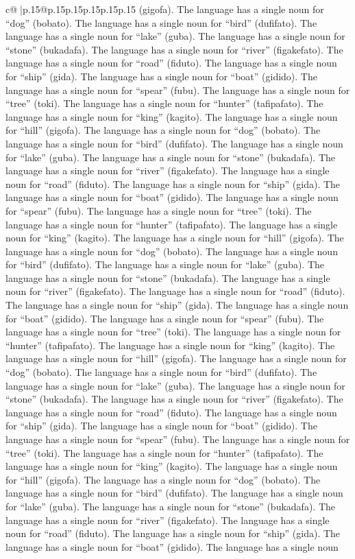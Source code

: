 \documentclass{article}
\begin{document}
{\begin{supertabular}{c@{$\;$}|p{.15\linewidth}@{}p{.15\linewidth}p{.15\linewidth}p{.15\linewidth}p{.15\linewidth}p{.15\linewidth}}
{{{(gigofa). The language has a single noun for “dog” (bobato). The language has a single noun for “bird” (dufifato). The language has a single noun for “lake” (guba). The language has a single noun for “stone” (bukadafa). The language has a single noun for “river” (figakefato). The language has a single noun for “road” (fiduto). The language has a single noun for “ship” (gida). The language has a single noun for “boat” (gidido). The language has a single noun for “spear” (fubu). The language has a single noun for “tree” (toki). The language has a single noun for “hunter” (tafipafato). The language has a single noun for “king” (kagito). The language has a single noun for “hill” (gigofa). The language has a single noun for “dog” (bobato). The language has a single noun for “bird” (dufifato). The language has a single noun for “lake” (guba). The language has a single noun for “stone” (bukadafa). The language has a single noun for “river” (figakefato). The language has a single noun for “road” (fiduto). The language has a single noun for “ship” (gida). The language has a single noun for “boat” (gidido). The language has a single noun for “spear” (fubu). The language has a single noun for “tree” (toki). The language has a single noun for “hunter” (tafipafato). The language has a single noun for “king” (kagito). The language has a single noun for “hill” (gigofa). The language has a single noun for “dog” (bobato). The language has a single noun for “bird” (dufifato). The language has a single noun for “lake” (guba). The language has a single noun for “stone” (bukadafa). The language has a single noun for “river” (figakefato). The language has a single noun for “road” (fiduto). The language has a single noun for “ship” (gida). The language has a single noun for “boat” (gidido). The language has a single noun for “spear” (fubu). The language has a single noun for “tree” (toki). The language has a single noun for “hunter” (tafipafato). The language has a single noun for “king” (kagito). The language has a single noun for “hill” (gigofa). The language has a single noun for “dog” (bobato). The language has a single noun for “bird” (dufifato). The language has a single noun for “lake” (guba). The language has a single noun for “stone” (bukadafa). The language has a single noun for “river” (figakefato). The language has a single noun for “road” (fiduto). The language has a single noun for “ship” (gida). The language has a single noun for “boat” (gidido). The language has a single noun for “spear” (fubu). The language has a single noun for “tree” (toki). The language has a single noun for “hunter” (tafipafato). The language has a single noun for “king” (kagito). The language has a single noun for “hill” (gigofa). The language has a single noun for “dog” (bobato). The language has a single noun for “bird” (dufifato). The language has a single noun for “lake” (guba). The language has a single noun for “stone” (bukadafa). The language has a single noun for “river” (figakefato). The language has a single noun for “road” (fiduto). The language has a single noun for “ship” (gida). The language has a single noun for “boat” (gidido). The language has a single noun }}}
\end{supertabular}}
\end{document}
